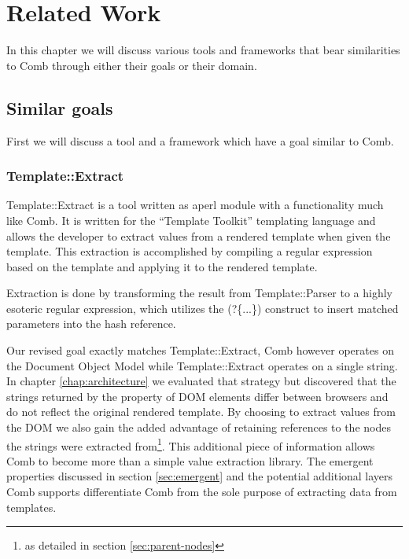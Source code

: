 \documentclass[thesis.tex]{subfiles}
\begin{document}
\chapter{Related Work}
\label{chap:related}
In this chapter we will discuss various tools and frameworks that bear
similarities to Comb through either their goals or their domain.


\section{Similar goals}
First we will discuss a tool and a framework which have a goal similar to Comb.

\subsection{Template::Extract}
Template::Extract\cite{TPLEXTRACT} is a tool written as aperl module with a
functionality much like Comb. It is written for the ``Template Toolkit''
templating language and allows the developer to extract values from a rendered
template when given the template.
This extraction is accomplished by compiling a regular expression based on the
template and applying it to the rendered template.

\begin{citequote}{\cite{TPLEXTRACT}}
Extraction is done by transforming the result from Template::Parser to a highly
esoteric regular expression, which utilizes the (?\{...\}) construct to insert
matched parameters into the hash reference.
\end{citequote}

Our revised goal exactly matches Template::Extract, Comb however operates on the
Document Object Model while Template::Extract operates on a single string.
In chapter \ref{chap:architecture} we evaluated that strategy but discovered
that the strings returned by the  property of DOM elements
differ between browsers and do not reflect the original rendered template.
By choosing to extract values from the DOM we also gain the added advantage
of retaining references to the nodes the strings were extracted
from\footnote{as detailed in section \ref{sec:parent-nodes}}.
This additional piece of information allows Comb to become more than a simple
value extraction library. The emergent properties discussed in
section \ref{sec:emergent} and the potential additional layers Comb supports
differentiate Comb from the sole purpose of extracting data from templates.
\end{document}
